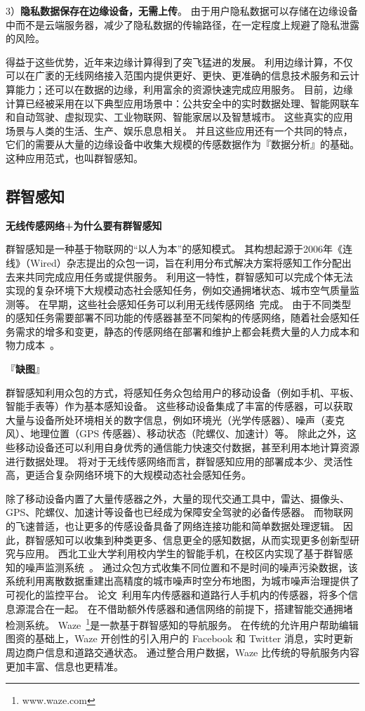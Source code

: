 3）\textbf{隐私数据保存在边缘设备，无需上传}。
由于用户隐私数据可以存储在边缘设备中而不是云端服务器，减少了隐私数据的传输路径，在一定程度上规避了隐私泄露的风险。

得益于这些优势，近年来边缘计算得到了突飞猛进的发展。
利用边缘计算，不仅可以在广袤的无线网络接入范围内提供更好、更快、更准确的信息技术服务和云计算能力；还可以在数据的边缘，利用富余的资源快速完成应用服务。
目前，边缘计算已经被采用在以下典型应用场景中：公共安全中的实时数据处理、智能网联车和自动驾驶、虚拟现实、工业物联网、智能家居以及智慧城市。
这些真实的应用场景与人类的生活、生产、娱乐息息相关。
并且这些应用还有一个共同的特点，它们的需要从大量的边缘设备中收集大规模的传感数据作为『数据分析』的基础。这种应用范式，也叫群智感知。

\subsection{群智感知}

\textbf{无线传感网络+为什么要有群智感知}

群智感知是一种基于物联网的“以人为本”的感知模式。
其构想起源于2006年《连线》（Wired）杂志提出的众包一词，旨在利用分布式解决方案将感知工作分配出去来共同完成应用任务或提供服务。
利用这一特性，群智感知可以完成个体无法实现的复杂环境下大规模动态社会感知任务，例如交通拥堵状态、城市空气质量监测等。
在早期，这些社会感知任务可以利用无线传感网络~\cite{DBLP:journals/cn/AkyildizSSC02}完成。
由于不同类型的感知任务需要部署不同功能的传感器甚至不同架构的传感网络，随着社会感知任务需求的增多和变更，静态的传感网络在部署和维护上都会耗费大量的人力成本和物力成本~\cite{CNKI/2006/WSNRen}。

『\textbf{缺图}』

群智感知利用众包的方式，将感知任务众包给用户的移动设备（例如手机、平板、智能手表等）作为基本感知设备。
这些移动设备集成了丰富的传感器，可以获取大量与设备所处环境相关的数字信息，例如环境光（光学传感器）、噪声（麦克风）、地理位置（GPS 传感器）、移动状态（陀螺仪、加速计）等。
除此之外，这些移动设备还可以利用自身优秀的通信能力快速交付数据，甚至利用本地计算资源进行数据处理。
将对于无线传感网络而言，群智感知应用的部署成本少、灵活性高，更适合复杂网络环境下的大规模动态社会感知任务。

除了移动设备内置了大量传感器之外，大量的现代交通工具中，雷达、摄像头、GPS、陀螺仪、加速计等设备也已经成为保障安全驾驶的必备传感器。
而物联网的飞速普适，也让更多的传感设备具备了网络连接功能和简单数据处理逻辑。
因此，群智感知可以收集到种类更多、信息更全的感知数据，从而实现更多创新型研究与应用。
西北工业大学利用校内学生的智能手机，在校区内实现了基于群智感知的噪声监测系统~\cite{CNKI/2014/CSNSYu}。
通过众包方式收集不同位置和不是时间的噪声污染数据，该系统利用离散数据重建出高精度的城市噪声时空分布地图，为城市噪声治理提供了可视化的监控平台。
论文~\cite{DBLP:conf/wcnc/AliAEJH12}利用车内传感器和道路行人手机内的传感器，将多个信息源混合在一起。
在不借助额外传感器和通信网络的前提下，搭建智能交通拥堵检测系统。
Waze~\footnote{www.waze.com}是一款基于群智感知的导航服务。
在传统的允许用户帮助编辑图资的基础上，Waze 开创性的引入用户的 Facebook 和 Twitter 消息，实时更新周边商户信息和道路交通状态。
通过整合用户数据，Waze 比传统的导航服务内容更加丰富、信息也更精准。

